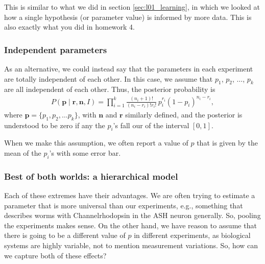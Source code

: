 This is similar to what we did in section \ref{sec:l01_learning}, in
which we looked at how a single hypothesis (or parameter value) is
informed by more data. This is also exactly what you did in homework 4.


\subsubsection{Independent parameters}
As an alternative, we could instead say that the parameters in each
experiment are totally independent of each other.  In this case, we
assume that $p_1$, $p_2$, $\ldots$, $p_k$ are all independent of each
other.  Thus, the posterior probability is
\begin{align}
P(\mathbf{p}\mid \mathbf{r},\mathbf{n}, I) = \prod_{i=1}^k
\frac{(n_i+1)!}{(n_i-r_i)!r_i!}\,p_i^{r_i}(1-p_i)^{n_i-r_i},
\end{align}
where $\mathbf{p} = \{p_1, p_2, \ldots p_k\}$, with $\mathbf{n}$ and
$\mathbf{r}$ similarly defined, and the posterior is understood to be
zero if any the $p_i$'s fall our of the interval $[0,1]$.

When we make this assumption, we often report a value of $p$ that is
given by the mean of the $p_i$'s with some error bar.


\subsubsection{Best of both worlds: a hierarchical model}
Each of these extremes have their advantages.  We are often trying to
estimate a parameter that is more universal than our experiments,
e.g., something that describes worms with Channelrhodopsin in the ASH
neuron generally.  So, pooling the experiments makes sense.  On the
other hand, we have reason to assume that there is going to be a
different value of $p$ in different experiments, as biological systems
are highly variable, not to mention measurement variations.  So, how
can we capture both of these effects?

